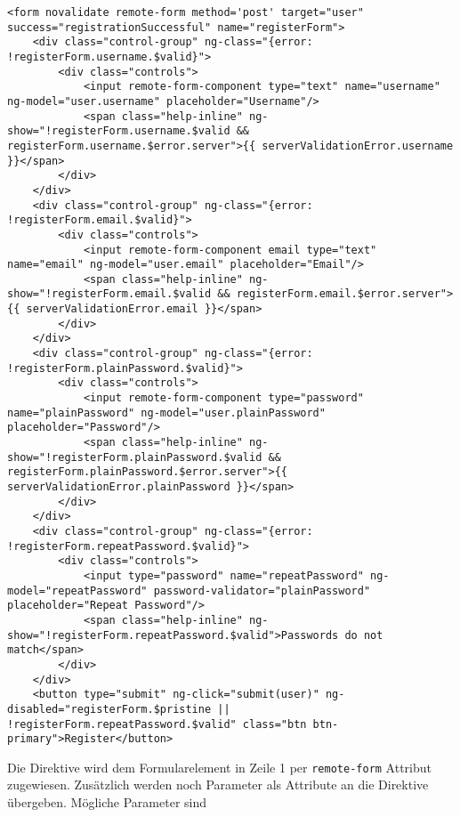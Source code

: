 \begin{lstlisting}[caption=Nutzung der remoteForm Direktive im HTML,label=listing:remoteForm_in_HTML]
 <form novalidate remote-form method='post' target="user" success="registrationSuccessful" name="registerForm">
    <div class="control-group" ng-class="{error: !registerForm.username.$valid}">
        <div class="controls">
            <input remote-form-component type="text" name="username" ng-model="user.username" placeholder="Username"/>
            <span class="help-inline" ng-show="!registerForm.username.$valid && registerForm.username.$error.server">{{ serverValidationError.username }}</span>
        </div>
    </div>
    <div class="control-group" ng-class="{error: !registerForm.email.$valid}">
        <div class="controls">
            <input remote-form-component email type="text" name="email" ng-model="user.email" placeholder="Email"/>
            <span class="help-inline" ng-show="!registerForm.email.$valid && registerForm.email.$error.server">{{ serverValidationError.email }}</span>
        </div>
    </div>
    <div class="control-group" ng-class="{error: !registerForm.plainPassword.$valid}">
        <div class="controls">
            <input remote-form-component type="password" name="plainPassword" ng-model="user.plainPassword" placeholder="Password"/>
            <span class="help-inline" ng-show="!registerForm.plainPassword.$valid && registerForm.plainPassword.$error.server">{{ serverValidationError.plainPassword }}</span>
        </div>
    </div>
    <div class="control-group" ng-class="{error: !registerForm.repeatPassword.$valid}">
        <div class="controls">
            <input type="password" name="repeatPassword" ng-model="repeatPassword" password-validator="plainPassword" placeholder="Repeat Password"/>
            <span class="help-inline" ng-show="!registerForm.repeatPassword.$valid">Passwords do not match</span>
        </div>
    </div>
    <button type="submit" ng-click="submit(user)" ng-disabled="registerForm.$pristine || !registerForm.repeatPassword.$valid" class="btn btn-primary">Register</button>
\end{lstlisting}
Die Direktive wird dem Formularelement in Zeile 1 per \texttt{remote-form} Attribut zugewiesen. Zusätzlich werden noch Parameter als Attribute an die Direktive übergeben. Mögliche Parameter sind
